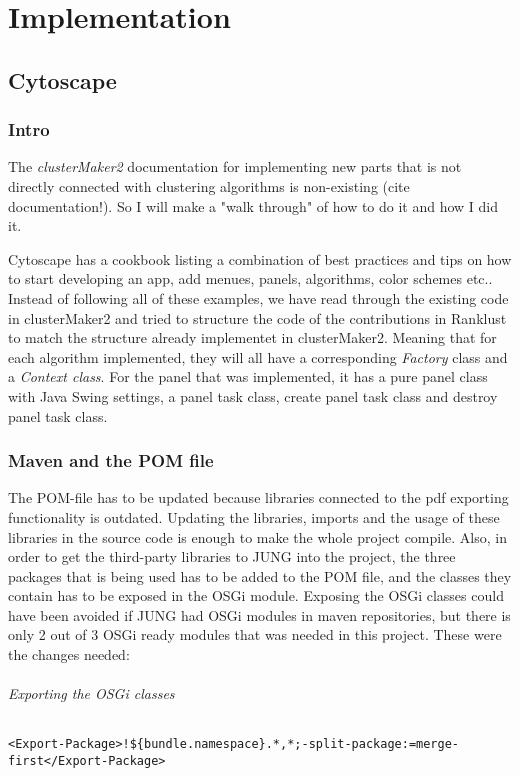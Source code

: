 \part{Implementation}
\label{pa:implementation}
\chapter{Cytoscape}
\section{Intro}
The \textit{clusterMaker2} documentation for implementing new parts that is not
directly connected with clustering algorithms is non-existing (cite
documentation!). So I will make a "walk through" of how to do it and how I did it.

Cytoscape has a cookbook\cite{cytoscape-cookbook} listing a combination of best
practices and tips on how to start developing an app, add menues, panels,
algorithms, color schemes etc.. Instead of following all of these examples, we
have read through the existing code in clusterMaker2\cite{cm2-github} and tried
to structure the code of the contributions in Ranklust to match the structure
already implementet in clusterMaker2. Meaning that for each algorithm
implemented, they will all have a corresponding \textit{Factory} class and a
\textit{Context class}. For the panel that was implemented, it has a pure panel
class with Java Swing\cite{java-swing} settings, a panel task class, create
panel task class and destroy panel task class. %

\section{Maven and the POM file}
The POM-file has to be updated because libraries connected to the pdf exporting
functionality is outdated. Updating the libraries, imports and the usage of
these libraries in the source code is enough to make the whole project compile.
Also, in order to get the third-party libraries to JUNG\cite{jung} into the
project, the three packages that is being used has to be added to the POM file,
and the classes they contain has to be exposed in the OSGi module. Exposing the
OSGi classes could have been avoided if JUNG had OSGi modules in maven
repositories, but there is only 2 out of 3 OSGi ready modules that was needed in
this project. These were the changes needed:

\paragraph{Exporting the OSGi classes}
\begin{verbatim}
<Export-Package>!${bundle.namespace}.*,*;-split-package:=merge-first</Export-Package>
\end{verbatim}

